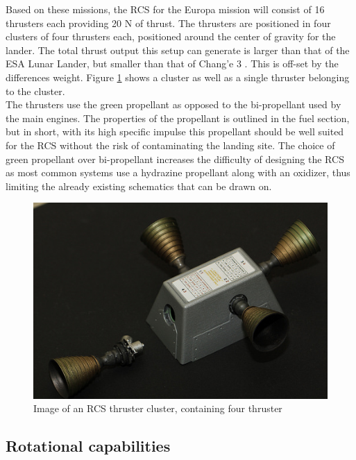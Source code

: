 \noindent
Based on these missions, the RCS for the Europa mission will consist of 16 thrusters each providing 20 N of thrust. The thrusters are positioned in four clusters of four thrusters each, positioned around the center of gravity for the lander. The total thrust output this setup can generate is larger than that of the ESA Lunar Lander, but smaller than that of Chang'e 3 \cite{ESA_pic} \cite{Chang_e_3}. This is off-set  by the differences weight. Figure \ref{fig:RCS_thruster} shows a cluster as well as a single thruster belonging to the cluster.\\

\noindent
The thrusters use the green propellant as opposed to the bi-propellant used by the main engines. The properties of the propellant is outlined in the fuel section, but in short, with its high specific impulse this propellant should be well suited for the RCS without the risk of contaminating the landing site. The choice of green propellant over bi-propellant increases the difficulty of designing the RCS as most common systems use a hydrazine propellant along with an oxidizer, thus limiting the already existing schematics that can be drawn on.

\begin{figure}[htb]
\begin{center}
\includegraphics[scale=0.6]{figures/RCS/RCS_thruster2}
\caption{Image of an RCS thruster cluster, containing four thruster \cite{RCS_pic}}
\label{fig:RCS_thruster}
\end{center}
\end{figure}

\subsection{Rotational capabilities}

